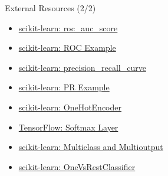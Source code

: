 \documentclass[10pt]{beamer}
\begin{document}
\begin{frame}{External Resources (2/2)}
  \justifying
  \footnotesize
  \begin{itemize}
    \item \href{https://scikit-learn.org/stable/modules/generated/sklearn.metrics.roc_auc_score.html}{scikit-learn: roc\_auc\_score}
    \item \href{https://scikit-learn.org/stable/auto_examples/model_selection/plot_roc.html}{scikit-learn: ROC Example}
    \item \href{https://scikit-learn.org/stable/modules/generated/sklearn.metrics.precision_recall_curve.html}{scikit-learn: precision\_recall\_curve}
    \item \href{https://scikit-learn.org/stable/auto_examples/model_selection/plot_precision_recall.html}{scikit-learn: PR Example}
    \item \href{https://scikit-learn.org/stable/modules/generated/sklearn.preprocessing.OneHotEncoder.html}{scikit-learn: OneHotEncoder}
    \item \href{https://www.tensorflow.org/api_docs/python/tf/keras/layers/Softmax}{TensorFlow: Softmax Layer}
    \item \href{https://scikit-learn.org/stable/modules/multiclass.html}{scikit-learn: Multiclass and Multioutput}
    \item \href{https://scikit-learn.org/stable/modules/generated/sklearn.multiclass.OneVsRestClassifier.html}{scikit-learn: OneVsRestClassifier}
  \end{itemize}
\end{frame}
\end{document}
